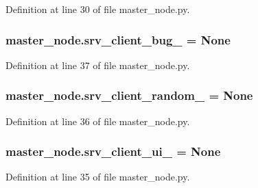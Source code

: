 Definition at line 30 of file master\+\_\+node.\+py.

\subsubsection[{\texorpdfstring{srv\+\_\+client\+\_\+bug\+\_\+}{srv_client_bug_}}]{\setlength{\rightskip}{0pt plus 5cm}master\+\_\+node.\+srv\+\_\+client\+\_\+bug\+\_\+ = None}\hypertarget{namespacemaster__node_ae7e05351b023ff9491aab8db55411203}{}\label{namespacemaster__node_ae7e05351b023ff9491aab8db55411203}


Definition at line 37 of file master\+\_\+node.\+py.

\subsubsection[{\texorpdfstring{srv\+\_\+client\+\_\+random\+\_\+}{srv_client_random_}}]{\setlength{\rightskip}{0pt plus 5cm}master\+\_\+node.\+srv\+\_\+client\+\_\+random\+\_\+ = None}\hypertarget{namespacemaster__node_a042ea25cd5902ccb0c1d8e6b752b32cd}{}\label{namespacemaster__node_a042ea25cd5902ccb0c1d8e6b752b32cd}


Definition at line 36 of file master\+\_\+node.\+py.

\subsubsection[{\texorpdfstring{srv\+\_\+client\+\_\+ui\+\_\+}{srv_client_ui_}}]{\setlength{\rightskip}{0pt plus 5cm}master\+\_\+node.\+srv\+\_\+client\+\_\+ui\+\_\+ = None}\hypertarget{namespacemaster__node_aa24ec2707042d83db651789d2416066f}{}\label{namespacemaster__node_aa24ec2707042d83db651789d2416066f}


Definition at line 35 of file master\+\_\+node.\+py.


